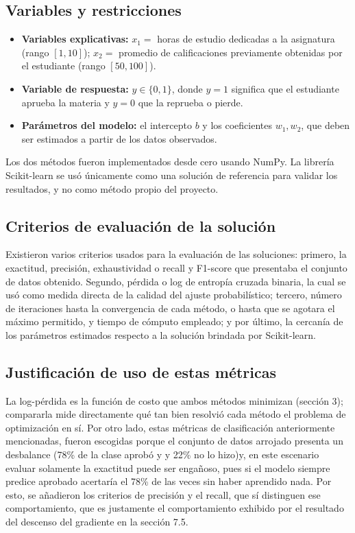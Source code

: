 \subsection{Variables y restricciones}
\begin{itemize}
    \item \textbf{Variables explicativas:} $x_1 =$ horas de estudio dedicadas a la asignatura (rango $[1, 10]$); $x_2 =$ promedio de calificaciones previamente obtenidas por el estudiante (rango $[50, 100]$).
    \item \textbf{Variable de respuesta:} $y \in \{0, 1\}$, donde $y = 1$ significa que el estudiante aprueba la materia y $y = 0$ que la reprueba o pierde.
    \item \textbf{Parámetros del modelo:} el intercepto $b$ y los coeficientes $w_1, w_2$, que deben ser estimados a partir de los datos observados.
\end{itemize}
Los dos métodos fueron implementados desde cero usando NumPy. La librería Scikit-learn se usó únicamente como una solución de referencia para validar los resultados, y no como método propio del proyecto.

\subsection{Criterios de evaluación de la solución}
Existieron varios criterios usados para la evaluación de las soluciones: primero, la exactitud, precisión, exhaustividad o recall y F1-score que presentaba el conjunto de datos obtenido. Segundo, pérdida o log de entropía cruzada binaria, la cual se usó como medida directa de la calidad del ajuste probabilístico; tercero, número de iteraciones hasta la convergencia de cada método, o hasta que se agotara el máximo permitido, y tiempo de cómputo empleado; y por último, la cercanía de los parámetros estimados respecto a la solución brindada por Scikit-learn.

\subsection{Justificación de uso de estas métricas}
La log-pérdida es la función de costo que ambos métodos minimizan (sección 3); compararla mide directamente qué tan bien resolvió cada método el problema de optimización en sí. Por otro lado, estas métricas de clasificación anteriormente mencionadas, fueron escogidas porque el conjunto de datos arrojado presenta un desbalance (78\% de la clase aprobó y y 22\% no lo hizo)y, en este escenario evaluar solamente la exactitud puede ser engañoso, pues si el modelo siempre predice aprobado acertaría el 78\% de las veces sin haber aprendido nada. Por esto, se añadieron los criterios de precisión y el recall, que sí distinguen ese comportamiento, que es justamente el comportamiento exhibido por el resultado del descenso del gradiente en la sección 7.5.

